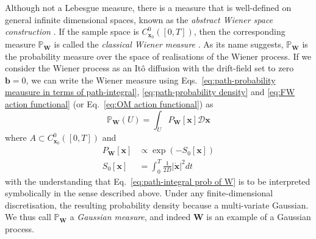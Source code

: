 Although not a Lebesgue measure, there is a measure that is well-defined on general infinite dimensional spaces, known as the \textit{abstract Wiener space construction} \citep{grossAbstractWienerSpaces1967, MeasureIntegrationTheory1972}. If the sample space is $C_{\mathbf{x}_0}^0([0,T])$, then the corresponding measure $\mathbb{P}_\mathbf{W}$ is called the \textit{classical Wiener measure} \citep{cameronTransformationsWeinerIntegrals1944b, cameronTransformationsWienerIntegrals1945a}. As its name suggests, $\mathbb{P}_\mathbf{W}$ is the probability measure over the space of realisations of the Wiener process. If we consider the Wiener process as an It\^{o} diffusion with the drift-field set to zero $\mathbf{b} = 0$, we can write the Wiener measure using Eqs.~\ref{eq:path-probability meausure in terms of path-integral}, \ref{eq:path-probability density} and \ref{eq:FW action functional} (or Eq.~\ref{eq:OM action functional}) as
\begin{equation} \label{eq:path-integral prob of W}
\mathbb{P}_\mathbf{W}(U) = \int_U P_\mathbf{W}[\mathbf{x}] \mathcal{D} \mathbf{x}
\end{equation}
where $A \subset C_{\mathbf{x}_0}^0([0,T])$ and
\begin{subequations}
\begin{align}
P_\mathbf{W}[\mathbf{x}] & \propto \exp( - S_0[\mathbf{x}] ) \\
S_0[\mathbf{x}] & = \int_0^T \frac{1}{2D} |\dot{\mathbf{x}}|^2 dt
\end{align}
\end{subequations}
with the understanding that Eq.~\ref{eq:path-integral prob of W} is to be interpreted symbolically in the sense described above. Under any finite-dimensional discretisation, the resulting probability density because a multi-variate Gaussian. We thus call $\mathbb{P}_\mathbf{W}$ a \textit{Gaussian measure}, and indeed $\mathbf{W}$ is an example of a Gaussian process.


